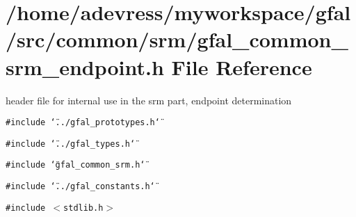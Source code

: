 \section{/home/adevress/myworkspace/gfal/src/common/srm/gfal\_\-common\_\-srm\_\-endpoint.h File Reference}
\label{gfal__common__srm__endpoint_8h}
header file for internal use in the srm part, endpoint determination 

{\tt \#include \char`\"{}../gfal\_\-prototypes.h\char`\"{}}\par
{\tt \#include \char`\"{}../gfal\_\-types.h\char`\"{}}\par
{\tt \#include \char`\"{}gfal\_\-common\_\-srm.h\char`\"{}}\par
{\tt \#include \char`\"{}../gfal\_\-constants.h\char`\"{}}\par
{\tt \#include $<$stdlib.h$>$}\par
